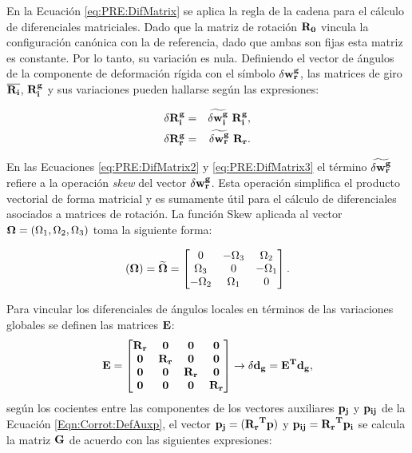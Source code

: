 En la Ecuación \eqref{eq:PRE:DifMatrix} se aplica la regla de la cadena para el cálculo de diferenciales matriciales. Dado que la matriz de rotación $\bf{R_0}$ vincula la configuración canónica con la de referencia, dado que ambas son fijas esta matriz es constante. Por lo tanto, su variación es nula. Definiendo el vector de ángulos de la componente de deformación rígida con el símbolo $\delta\bf{w}_r^g$, las matrices de giro $\overline{\bf{R_i}}$, $ \bf{R_i^g}$ y sus variaciones pueden hallarse según las expresiones:

\begin{eqnarray}
	\label{eq:PRE:DifMatrix2}
	\delta \bf{R_i^g} &=& \widetilde{\delta\bf{w}_i^g}~\bf{R}_i^g,\\
	\label{eq:PRE:DifMatrix3}
	\delta \bf{R_r^g} &=& \widetilde{\delta\bf{w}_r^g}~\bf{R}_r.
\end{eqnarray}

En las Ecuaciones \eqref{eq:PRE:DifMatrix2} y \eqref{eq:PRE:DifMatrix3} el término $\widetilde{\delta\bf{w}_r^g}$ refiere a la operación \textit{skew} del vector $\delta\bf{w}_r^g$. Esta operación simplifica el producto vectorial de forma matricial y es sumamente útil para el cálculo de diferenciales asociados a matrices de rotación. La función \gls{Skew} aplicada al vector $\bf{\Omega}=\text{$(\Omega_1,\Omega_2,\Omega_3)$}$ toma la siguiente forma:

\begin{equation}\label{eq:PRE:Skew}
	(\bf{\Omega})=\widetilde{\bf{\Omega}}
	=
	\begin{bmatrix}
		0 &-\Omega_3  &\Omega_2   \\
		\Omega_3&0  & -\Omega_1  \\
		-\Omega_2  & \Omega_1 & 0
	\end{bmatrix}.
\end{equation}

Para vincular los diferenciales de ángulos locales en términos de las variaciones globales se definen las matrices $\bf{E}$: 
\begin{equation}\label{Eqn:PRE:Corrot:DefE}
	\bf{E}=\begin{bmatrix}
		\bf{R_r}& \bf{0}   & \bf{0}   & \bf{0} \\
		\bf{0}  & \bf{R_r} & \bf{0}   & \bf{0}\\
		\bf{0}  & \bf{0}   & \bf{R_r} & \bf{0} \\
		\bf{0}  & \bf{0}   & \bf{0}   & \bf{R_r}
	\end{bmatrix}\rightarrow \delta \bf{d_g}=E^T \bf{d_g},
\end{equation}
 según los cocientes entre las componentes de los vectores auxiliares $\bf{p}_j$ y $\bf{p_{ij}}$ de la Ecuación \eqref{Eqn:Corrot:DefAuxp}, el vector  $\bf{p_{j}}=(\bf{R_r}^T\bf{p})$ y  $\bf{p_{ij}}=\bf{R_r}^T\bf{p}_i$ se calcula la matriz $\bf{G}$ de acuerdo con las siguientes expresiones:


